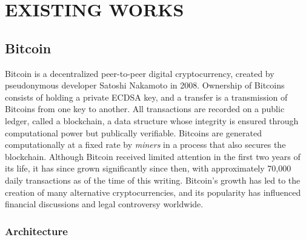 

\chapter{\uppercase{Existing Works}}

\section{Bitcoin} 

Bitcoin is a decentralized peer-to-peer digital cryptocurrency, created by pseudonymous developer Satoshi Nakamoto in 2008. Ownership of Bitcoins consists of holding a private ECDSA key, and a transfer is a transmission of Bitcoins from one key to another. All transactions are recorded on a public ledger, called a blockchain, a data structure whose integrity is ensured through computational power but publically verifiable. Bitcoins are generated computationally at a fixed rate by \textit{miners} in a process that also secures the blockchain. Although Bitcoin received limited attention in the first two years of its life, it has since grown significantly since then, with approximately 70,000 daily transactions as of the time of this writing. Bitcoin's growth has led to the creation of many alternative cryptocurrencies, and its popularity has influenced financial discussions and legal controversy worldwide.

\subsection{Architecture}

